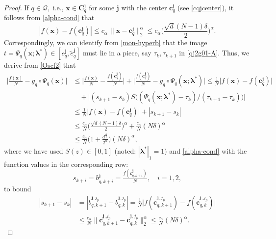 \documentclass[10pt,reqno,final]{amsart}
\theoremstyle{remark}
\theoremstyle{definition}
\newcommand{\bs}[1]{\boldsymbol{#1}}
\begin{document}
\begin{proof}
If $q\in {\mathcal Q},$ i.e.,  $\bs x\in  \bs C_q^{\bs{j}}$  for some $\bs j$ with the center $\bs{c}_{q}^{\bs{j}}$ (see \eqref{cqjcenter}),  it follows from \eqref{alpha-cond}  that
\begin{equation}\label{Oscf2}
|f(\bs{x})-f(\bs{c}_q^{\bs{j}})|\leq c_{\alpha}\,\|\bs{x}-\bs{c}_q^{\bs{j}}\|^{\alpha}_2 \leq c_{\alpha} \Big(\frac{\sqrt{d}(N-1)\delta}{2}\Big)^{\alpha}.
\end{equation}
Correspondingly, we can identify from  \eqref{mon-hyperb} that the image $t=\Psi_q(\bs{x};\bs \lambda^*)\in [e_q^{\bs j}, \tilde e_q^{\bs j}]$ must lie in a piece, say $\tau_k, \tau_{k+1}$ in \eqref{qj2g01-A}.  Thus,   
 we  derive from   \eqref{Oscf2} that 
\begin{equation}\label{Nsquare2}
\begin{split}
\Big|\frac{f(\bs{x})}{N}  -g_q\circ\Psi_q(\bs{x})\Big| & \le  \Big|\frac {f(\bs{x})}N - \frac   {f(\bs{c}_q^{\bs{j}})} N\Big|+\Big|\frac   {f(\bs{c}_q^{\bs{j}})} N-g_q\circ\Psi_q(\bs{x};\bs \lambda^*)\Big| \le \frac 1 N \big|{f(\bs{x})}-   {f(\bs{c}_q^{\bs{j}})} \big|\\[4pt]
&\quad +\big|(s_{k+1}-s_k) S\big((\Psi_q(\bs x;\bs \lambda^*)-\tau_k)/(\tau_{k+1}-\tau_k)\big)\big|\\[4pt]
&\le \frac 1 N \big|{f(\bs{x})}-   {f(\bs{c}_q^{\bs{j}})} \big|+|s_{k+1}-s_k | \\[4pt]
&\le  \frac{c_{\alpha}} N \Big(\frac{\sqrt{d}(N-1)\delta}{2}\Big)^{\alpha}+ \frac{c_{\alpha}}{N} (N\delta)^{\alpha}
\\[4pt]
&\leq \frac{c_{\alpha}}{N}  \Big(1+\frac{d^{\frac{\alpha}{2}}} {2^{\alpha}}\Big)(N\delta)^{\alpha},
\end{split}
\end{equation}
where we have used $S(z)\in [0,1]$ (noted: $|\bs \lambda^*|_1=1$) and  \eqref{alpha-cond} with the function values in the corresponding row:  
$$s_{k+i}=b_{q,k+i}^{\bs j}=\tfrac{f(\bs{c}_{q,k+i}^{\bs{j}})}{N},\quad i=1,2,$$  to bound
\begin{equation}\label{bqjest}
\begin{split}
|s_{k+1}-s_k | &=|b_{q,k+1}^{\bs j,j_p}-b_{q,k}^{\bs j,j_p}|=\frac 1 N\big|f(\bs c_{q,k+1}^{\bs j,j_p})-f(\bs c_{q,k}^{\bs j,j_p})\big|\\[4pt]
  &\le \frac {c_{\alpha}} N \big\|\bs c_{q,k+1}^{\bs j,j_p}-\bs c_{q,k}^{\bs j,j_p}\big\|_2^\alpha  \leq \frac{c_{\alpha}}{N} (N\delta)^{\alpha}.
  \end{split}
\end{equation}

\end{proof}
\end{document}
